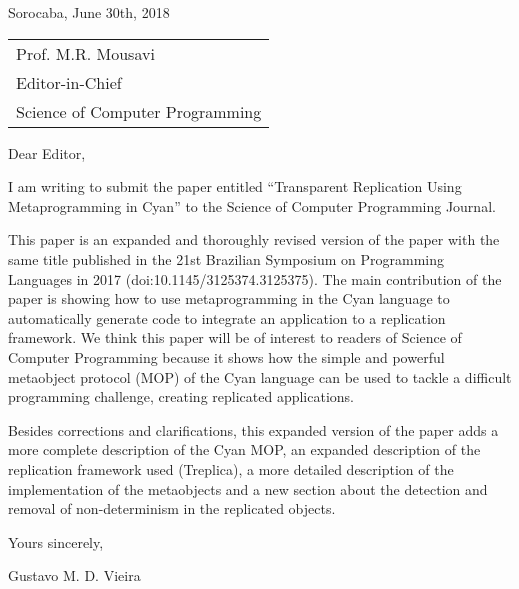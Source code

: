 \documentclass[12pt,a4paper]{article}
\begin{document}
\thispagestyle{empty}

\vfill

\hfill Sorocaba, June 30th, 2018

\vfill

\begin{tabular}{l}
Prof. M.R. Mousavi \\
Editor-in-Chief \\
Science of Computer Programming
\end{tabular}

\vfill

Dear Editor,

\vfill

I am  writing to submit  the paper entitled  ``Transparent Replication
Using Metaprogramming in Cyan'' to the Science of Computer Programming
Journal.

This paper is an expanded and  thoroughly revised version of the paper
with  the same  title published  in  the 21st  Brazilian Symposium  on
Programming Languages in  2017 (doi:10.1145/3125374.3125375). The main
contribution of the paper is showing how to use metaprogramming in the
Cyan  language   to  automatically  generate  code   to  integrate  an
application to a replication framework. We think this paper will be of
interest  to readers  of Science  of Computer  Programming because  it
shows how  the simple  and powerful metaobject  protocol (MOP)  of the
Cyan language can be used to tackle a difficult programming challenge,
creating replicated applications.

Besides corrections  and clarifications, this expanded  version of the
paper adds  a more complete description  of the Cyan MOP,  an expanded
description  of  the replication  framework  used  (Treplica), a  more
detailed description  of the implementation  of the metaobjects  and a
new section about the detection  and removal of non-determinism in the
replicated objects.

Yours sincerely,

\vfill

\begin{center}
Gustavo M. D. Vieira
\end{center}
\end{document}

